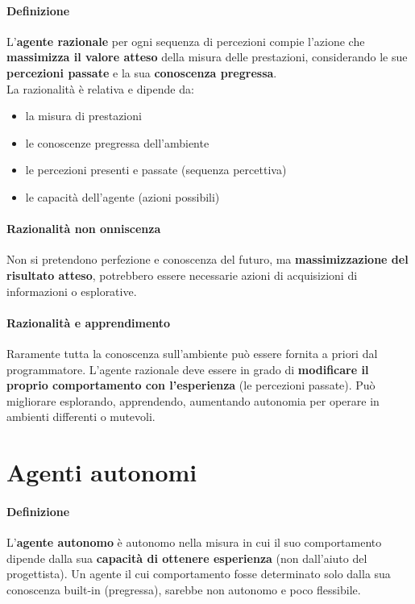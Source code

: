 \documentclass[a4paper, 12pt]{report}
\begin{document}
            \paragraph{Definizione} L'\textbf{agente razionale} per ogni sequenza di percezioni compie l’azione che \textbf{massimizza il valore atteso} della 
            misura delle prestazioni, considerando le sue \textbf{percezioni passate} e la sua \textbf{conoscenza pregressa}.\\
            La razionalità è relativa e dipende da:
            \begin{itemize}
                \item la misura di prestazioni
                \item le conoscenze pregressa dell’ambiente 
                \item le percezioni presenti e passate (sequenza percettiva)
                \item le capacità dell’agente (azioni possibili)
            \end{itemize}
            \paragraph{Razionalità non onniscenza} Non si pretendono perfezione e conoscenza del futuro, ma \textbf{massimizzazione del risultato atteso},
            potrebbero essere necessarie azioni di acquisizioni di informazioni o esplorative.
            \paragraph{Razionalità e apprendimento} Raramente tutta la conoscenza sull'ambiente può essere fornita a priori dal programmatore.
            L’agente razionale deve essere in grado di \textbf{modificare il proprio comportamento con 
            l’esperienza} (le percezioni passate). Può migliorare esplorando, apprendendo, aumentando autonomia per operare in ambienti differenti o mutevoli.
        \section{Agenti autonomi}
            \paragraph{Definizione} L'\textbf{agente autonomo} è autonomo nella misura in cui il suo comportamento dipende dalla sua \textbf{capacità di ottenere esperienza}
            (non dall'aiuto del progettista). Un agente il cui comportamento fosse determinato solo dalla sua conoscenza built-in (pregressa), sarebbe non autonomo e poco flessibile.
\end{document}
